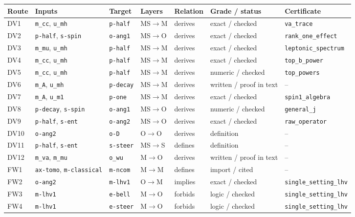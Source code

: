 \begin{ruledtabular}
\begin{tabular}{lllllll}
Route & Inputs & Target & Layers & Relation & Grade / status & Certificate \\
\hline
DV1 & \texttt{m\_cc}, \texttt{u\_mh} & \texttt{p-half} & MS$\to$M & derives & exact / checked & \texttt{va\_trace} \\
DV2 & \texttt{p-half}, \texttt{s-spin} & \texttt{o-ang1} & MS$\to$O & derives & exact / checked & \texttt{rank\_one\_effect} \\
DV3 & \texttt{m\_mu}, \texttt{u\_mh} & \texttt{p-half} & MS$\to$M & derives & exact / checked & \texttt{leptonic\_spectrum} \\
DV4 & \texttt{m\_cc}, \texttt{u\_mh} & \texttt{p-half} & MS$\to$M & derives & exact / checked & \texttt{top\_b\_power} \\
DV5 & \texttt{m\_cc}, \texttt{u\_mh} & \texttt{p-half} & MS$\to$M & derives & numeric / checked & \texttt{top\_powers} \\
DV6 & \texttt{m\_A}, \texttt{u\_mh} & \texttt{p-decay} & MS$\to$M & derives & written / proof in text & -- \\
DV7 & \texttt{m\_A}, \texttt{u\_m1} & \texttt{p-one} & MS$\to$M & derives & exact / checked & \texttt{spin1\_algebra} \\
DV8 & \texttt{p-decay}, \texttt{s-spin} & \texttt{o-ang1} & MS$\to$O & derives & numeric / checked & \texttt{general\_j} \\
DV9 & \texttt{p-half}, \texttt{s-ent} & \texttt{o-ang2} & MS$\to$O & derives & exact / checked & \texttt{raw\_operator} \\
DV10 & \texttt{o-ang2} & \texttt{o-D} & O$\to$O & derives & definition & -- \\
DV11 & \texttt{p-half}, \texttt{s-ent} & \texttt{s-steer} & MS$\to$S & defines & definition & -- \\
DV12 & \texttt{m\_va}, \texttt{m\_mu} & \texttt{o\_wu} & M$\to$O & derives & written / proof in text & -- \\
FW1 & \texttt{ax-tomo}, \texttt{m-classical} & \texttt{m-ncom} & M$\to$M & defines & import / cited & -- \\
FW2 & \texttt{o-ang2} & \texttt{m-lhv1} & O$\to$M & implies & exact / checked & \texttt{single\_setting\_lhv} \\
FW3 & \texttt{m-lhv1} & \texttt{e-bell} & M$\to$O & forbids & logic / checked & \texttt{single\_setting\_lhv} \\
FW4 & \texttt{m-lhv1} & \texttt{e-steer} & M$\to$O & forbids & logic / checked & \texttt{single\_setting\_lhv} \\

\end{tabular}
\end{ruledtabular}
